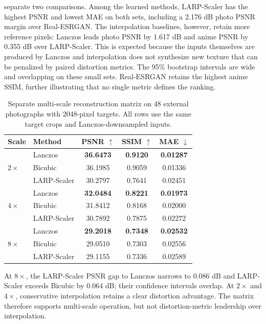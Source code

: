 \documentclass[10pt]{article}
\newcommand{\method}{LARP-Scaler\xspace}
\begin{document}
 separate two comparisons. Among the
learned methods, \method has the highest PSNR and lowest MAE on both sets,
including a 2.176 dB photo PSNR margin over Real-ESRGAN. The interpolation
baselines, however, retain more reference pixels: Lanczos leads photo PSNR by
1.617 dB and anime PSNR by 0.355 dB over \method. This is expected because the
inputs themselves are produced by Lanczos and interpolation does not synthesize
new texture that can be penalized by paired distortion metrics. The 95\%
bootstrap intervals are wide and overlapping on these small sets. Real-ESRGAN
retains the highest anime SSIM, further illustrating that no single metric
defines the ranking.

\begin{table}[H]
  \centering
  \caption{Separate multi-scale reconstruction matrix on 48 external
  photographs with 2048-pixel targets. All rows use the same target crops and
  Lanczos-downsampled inputs.}
  \label{tab:multiscale48}
  \small
  \begin{tabular}{llccc}
    \toprule
    Scale & Method & PSNR $\uparrow$ & SSIM $\uparrow$ & MAE $\downarrow$\\
    \midrule
    \multirow{3}{*}{$2\times$}
      & Lanczos & \textbf{36.6473} & \textbf{0.9120} & \textbf{0.01287}\\
      & Bicubic & 36.1985 & 0.9059 & 0.01336\\
      & \method & 30.2797 & 0.7641 & 0.02451\\
    \midrule
    \multirow{3}{*}{$4\times$}
      & Lanczos & \textbf{32.0484} & \textbf{0.8221} & \textbf{0.01973}\\
      & Bicubic & 31.8412 & 0.8168 & 0.02000\\
      & \method & 30.7892 & 0.7875 & 0.02272\\
    \midrule
    \multirow{3}{*}{$8\times$}
      & Lanczos & \textbf{29.2018} & \textbf{0.7348} & \textbf{0.02532}\\
      & Bicubic & 29.0510 & 0.7303 & 0.02556\\
      & \method & 29.1155 & 0.7336 & 0.02589\\
    \bottomrule
  \end{tabular}
\end{table}

At $8\times$, the \method PSNR gap to Lanczos narrows to 0.086 dB and
\method exceeds Bicubic by 0.064 dB; their confidence intervals overlap. At
$2\times$ and $4\times$, conservative interpolation retains a clear distortion
advantage. The matrix therefore supports multi-scale operation, but not
distortion-metric leadership over interpolation.
\end{document}
